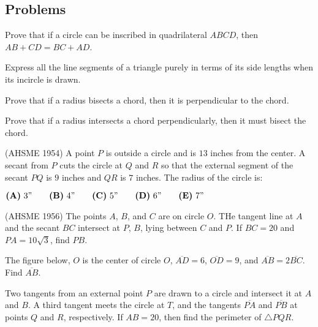 \subsection{Problems}
\begin{problem}
Prove that if a circle can be inscribed in quadrilateral $ABCD$, then $AB+CD=BC+AD$.
\end{problem}
\begin{problem}
Express all the line segments of a triangle purely in terms of its side lengths when its incircle is drawn.
\end{problem}
\begin{problem}
Prove that if a radius bisects a chord, then it is perpendicular to the chord.
\end{problem}
\begin{problem}
Prove that if a radius intersects a chord perpendicularly, then it must bisect the chord.
\end{problem}
\begin{problem}
(AHSME 1954) A point $P$ is outside a circle and is $13$ inches from the center. A secant from $P$ cuts the circle at $Q$ and $R$ so that the external segment of the secant $PQ$ is $9$ inches and $QR$ is $7$ inches. The radius of the circle is:

$\textbf{(A)}\ 3" \qquad \textbf{(B)}\ 4" \qquad \textbf{(C)}\ 5" \qquad \textbf{(D)}\ 6"\qquad\textbf{(E)}\ 7"$
\end{problem}
\begin{problem}
(AHSME 1956) The points $A$, $B$, and $C$ are on circle $O$. THe tangent line at $A$ and the secant $BC$ intersect at $P$, $B$, lying between $C$ and $P$. If $BC=20$ and $PA=10\sqrt{3}$, find $PB$.
\end{problem}
\begin{problem}
The figure below, $O$ is the center of circle $O$, $\overline{AD}=6$, $\overline{OD}=9$, and $\overline{AB} = 2\overline{BC}$. Find $\overline{AB}$.
\begin{center}
\end{center}
\end{problem}
\begin{problem}
Two tangents from an external point $P$ are drawn to a circle and intersect it at $A$ and $B$. A third tangent meets the circle at $T$, and the tangents $\overline{PA}$ and $\overline{PB}$ at points $Q$ and $R$, respectively. If $AB=20$, then find the perimeter of $\triangle PQR$.
\end{problem}